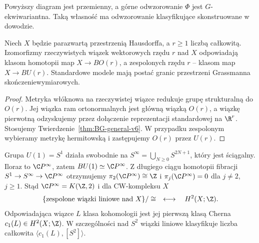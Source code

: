 \begin{center}
\end{center}
Powyższy diagram jest przemienny, a górne odwzorowanie
$\Phi$ jest $G$-ekwiwariantna. Taką własność ma
odwzorowanie klasyfikujące skonstruowane w dowodzie.

\begin{wniosek}
Niech $X$ będzie parazwartą przestrzenią Hausdorffa, a $r\ge1$
liczbą całkowitą.
Izomorfizmy rzeczywistych wiązek wektorowych rzędu $r$
nad $X$ odpowiadają klasom homotopii map
$X\to BO(r)$, a zespolonych rzędu $r$ -- klasom map
$X\to BU(r)$. Standardowe modele mają postać
granic przestrzeni Grassmanna skończeniewymiarowych.
\end{wniosek}
\begin{proof}
Metryka włóknowa na rzeczywistej wiązce redukuje
grupę strukturalną do $O(r)$. Jej wiązka ram
ortonormalnych jest główną wiązką $O(r)$,
a wiązkę pierwotną odzyskujemy przez dołączenie
reprezentacji standardowej na $\R^r$.
Stosujemy Twierdzenie~\ref{thm:BG-general-v6}.
W przypadku zespolonym wybieramy metrykę hermitowską
i zastępujemy $O(r)$ przez $U(r)$.
\end{proof}

\begin{przyklad}
Grupa $U(1)=S^1$ działa swobodnie na
$S^\infty=\bigcup_{N\ge0}S^{2N+1}$, który jest
ściągalny. Iloraz to $\C P^\infty$, zatem
$BU(1)\simeq\C P^\infty$. Z długiego ciągu homotopii
fibracji $S^1\to S^\infty\to\C P^\infty$ otrzymujemy
$\pi_2(\C P^\infty)\cong\Z$ i
$\pi_j(\C P^\infty)=0$ dla $j\ne2$, $j\ge1$.
Stąd $\C P^\infty=K(\Z,2)$ i dla CW-kompleksu $X$
\[
\{\text{zespolone wiązki liniowe nad }X\}/\cong
\quad\longleftrightarrow\quad H^2(X;\Z).
\]
Odpowiadająca wiązce $L$ klasa kohomologii jest
jej pierwszą klasą Cherna $c_1(L)\in H^2(X;\Z)$. W szczególności
nad $S^2$ wiązki liniowe klasyfikuje liczba całkowita
$\langle c_1(L),[S^2]\rangle$.
\end{przyklad}


